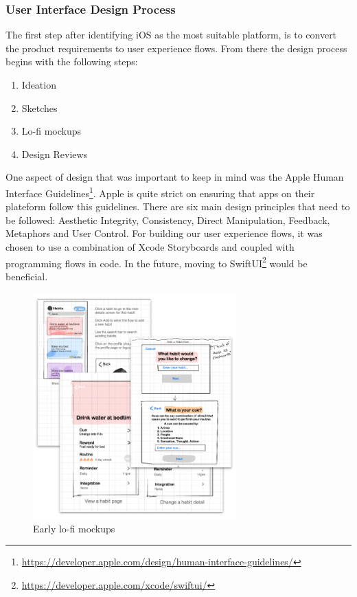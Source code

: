\subsubsection{User Interface Design Process}
The first step after identifying iOS as the most suitable platform, is to convert the product requirements to user experience flows. From there the design process begins with the following steps:
\begin{enumerate}
    \item Ideation
    \item Sketches
    \item Lo-fi mockups
    \item Design Reviews
\end{enumerate}
One aspect of design that was important to keep in mind was the Apple Human Interface Guidelines\footnote{\url{https://developer.apple.com/design/human-interface-guidelines/}}. Apple is quite strict on ensuring that apps on their plateform follow this guidelines. There are six main design principles that need to be followed: Aesthetic Integrity, Consistency, Direct Manipulation, Feedback, Metaphors and User Control.
\newline \newline
For building our user experience flows, it was chosen to use a combination of Xcode Storyboards and coupled with programming flows in code. In the future, moving to SwiftUI\footnote{\url{https://developer.apple.com/xcode/swiftui/}} would be beneficial.
\begin{figure}[h]
\centering
\includegraphics[width=0.7\textwidth]{images/mockups.png}
\caption{Early lo-fi mockups}
\end{figure}
